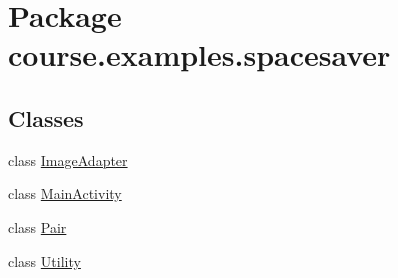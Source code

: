 \hypertarget{namespacecourse_1_1examples_1_1spacesaver}{}\section{Package course.\+examples.\+spacesaver}
\label{namespacecourse_1_1examples_1_1spacesaver}
\subsection*{Classes}
\begin{DoxyCompactItemize}
\item 
class \hyperlink{classcourse_1_1examples_1_1spacesaver_1_1_image_adapter}{Image\+Adapter}
\item 
class \hyperlink{classcourse_1_1examples_1_1spacesaver_1_1_main_activity}{Main\+Activity}
\item 
class \hyperlink{classcourse_1_1examples_1_1spacesaver_1_1_pair}{Pair}
\item 
class \hyperlink{classcourse_1_1examples_1_1spacesaver_1_1_utility}{Utility}
\end{DoxyCompactItemize}
